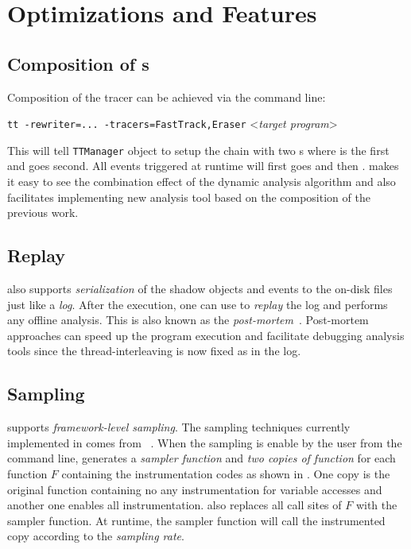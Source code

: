 \section{Optimizations and Features}
\label{s:ThreadTracer-Optimizations}

\subsection{Composition of \Tracer{}s}
Composition of the tracer can be achieved via the command line:
\begin{center}
	\verb|tt -rewriter=... -tracers=FastTrack,Eraser| \textless\textit{target program}\textgreater
\end{center}
This will tell \verb|TTManager| object to setup the \Tracer{} chain with two \Tracer{}s where \FastTrack{} is the first and \Eraser{} goes second. All events triggered at runtime will first goes \FastTrack{} \Tracer{} and then \Eraser{}. \ThreadTracer{} makes it easy to see the combination effect of the dynamic analysis algorithm and also facilitates implementing new analysis tool based on the composition of the previous work.

\subsection{Replay}
\ThreadTracer{} also supports \textit{serialization} of the shadow objects and events to the on-disk files just like a \textit{log}. After the execution, one can use \ThreadTracer{} to \textit{replay} the log and performs any offline analysis. This is also known as the \textit{post-mortem}~\cite{Helmbold:1994p1182}. Post-mortem approaches can speed up the program execution and facilitate debugging analysis tools since the thread-interleaving is now fixed as in the log.

\subsection{Sampling}
\ThreadTracer{} supports \textit{framework-level sampling}. The sampling techniques currently implemented in \ThreadTracer{} comes from \LiteRace{}~\cite{Marino:2009p846}. When the sampling is enable by the user from the command line, \Rewriter{} generates a \textit{sampler function} and \textit{two copies of function} for each function $F$ containing the instrumentation codes as shown in . One copy is the original function containing no any instrumentation for variable accesses and another one enables all instrumentation. \Rewriter{} also replaces all call sites of $F$ with the sampler function. At runtime, the sampler function will call the instrumented copy according to the \textit{sampling rate}.

